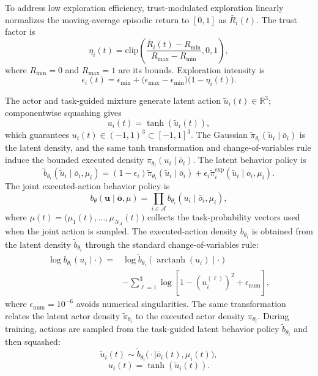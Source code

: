 \documentclass{cja}
\begin{document}
To address low exploration efficiency, trust-modulated exploration linearly normalizes the moving-average episodic return to $[0,1]$ as $\bar R_i(t)$. The trust factor is
\begin{equation}
\eta_i(t)
=
\mathrm{clip}
\left(
\frac{\bar R_i(t)-R_{\min}}{R_{\max}-R_{\min}},
0,1
\right),
\end{equation}
where $R_{\min}=0$ and $R_{\max}=1$ are its bounds. Exploration intensity is
\begin{equation}
\epsilon_i(t)
=
\epsilon_{\min}
+
\bigl(\epsilon_{\max}-\epsilon_{\min}\bigr)
\bigl(1-\eta_i(t)\bigr).
\end{equation}

The actor and task-guided mixture generate latent action $\widetilde u_i(t)\in\mathbb R^3$; componentwise squashing gives
\begin{equation}
u_i(t)
=
\tanh\!\left(\widetilde u_i(t)\right),
\end{equation}
which guarantees $u_i(t)\in(-1,1)^3\subset[-1,1]^3$. The Gaussian $\widetilde\pi_{\theta_i}(\widetilde u_i\mid\bar o_i)$ is the latent density, and the same tanh transformation and change-of-variables rule induce the bounded executed density $\pi_{\theta_i}(u_i\mid\bar o_i)$. The latent behavior policy is
\begin{equation}
\widetilde b_{\theta_i}(\widetilde u_i\mid\bar o_i,\mu_i)
=
(1-\epsilon_i)\widetilde\pi_{\theta_i}(\widetilde u_i\mid\bar o_i)
+\epsilon_i\widetilde\pi_i^{\mathrm{exp}}(\widetilde u_i\mid o_i,\mu_i).
\end{equation}
The joint executed-action behavior policy is
\begin{equation}
b_\theta(\mathbf u\mid\bar{\mathbf o},\mu)
=
\prod_{i\in\mathcal A}b_{\theta_i}(u_i\mid\bar o_i,\mu_i),
\end{equation}
where $\mu(t)=\bigl(\mu_1(t),\ldots,\mu_{N_A}(t)\bigr)$ collects the task-probability vectors used when the joint action is sampled. The executed-action density $b_{\theta_i}$ is obtained from the latent density $\widetilde b_{\theta_i}$ through the standard change-of-variables rule:
\begin{equation}
\begin{aligned}
\log b_{\theta_i}(u_i\mid\cdot)
= {}&
\log
\widetilde b_{\theta_i}
\left(
\operatorname{arctanh}(u_i)\mid\cdot
\right)
\\
&-
\sum_{\ell=1}^{3}
\log
\left[
1-\left(u_i^{(\ell)}\right)^2+\epsilon_{\mathrm{num}}
\right],
\end{aligned}
\end{equation}
where $\epsilon_{\mathrm{num}}=10^{-6}$ avoids numerical singularities. The same transformation relates the latent actor density $\widetilde\pi_{\theta_i}$ to the executed actor density $\pi_{\theta_i}$. During training, actions are sampled from the task-guided latent behavior policy $\widetilde b_{\theta_i}$ and then squashed:
\begin{equation}
\widetilde u_i(t)
\sim
\widetilde b_{\theta_i}
\bigl(\cdot\mid\bar o_i(t),\mu_i(t)\bigr),
\end{equation}
\begin{equation}
u_i(t)
=
\tanh\!\left(\widetilde u_i(t)\right).
\end{equation}
\end{document}
